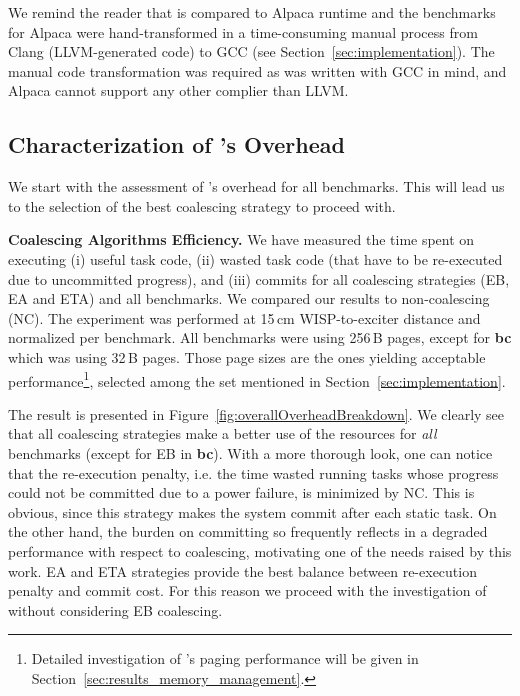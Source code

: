 We remind the reader that \sys is compared to Alpaca runtime and the benchmarks for Alpaca were hand-transformed in a time-consuming manual process from Clang (LLVM-generated code) to GCC (see Section~\ref{sec:implementation}). The manual code transformation was required as \sys was written with GCC in mind, and Alpaca cannot support any other complier than LLVM.

\subsection{Characterization of \sys's Overhead}
\label{sec:coala_overhead}

We start with the assessment of \sys's overhead for all benchmarks. This will lead us to the selection of the best coalescing strategy to proceed with.

\indent \textbf{Coalescing Algorithms Efficiency.} We have measured the time spent on executing (i) useful task code, (ii) wasted task code (that have to be re-executed due to uncommitted progress), and (iii) commits for all coalescing strategies (EB, EA and ETA) and all benchmarks. We compared our results to non-coalescing (NC). The experiment was performed at 15\,cm WISP-to-exciter distance and normalized per benchmark. All benchmarks were using 256\,B pages, except for \textbf{bc} which was using 32\,B pages. Those page sizes are the ones yielding acceptable performance\footnote{Detailed investigation of \sys's paging performance will be given in Section~\ref{sec:results_memory_management}.}, selected among the set mentioned in Section~\ref{sec:implementation}.

The result is presented in Figure~\ref{fig:overallOverheadBreakdown}. We clearly see that all coalescing strategies make a better use of the resources for \emph{all} benchmarks (except for EB in \textbf{bc}).
With a more thorough look, one can notice that the re-execution penalty, i.e. the time wasted running tasks whose progress could not be committed due to a power failure, is minimized by NC. This is obvious, since this strategy makes the system commit after each static task.
On the other hand, the burden on committing so frequently reflects in a degraded performance with respect to coalescing, motivating one of the needs raised by this work.
EA and ETA strategies provide the best balance between re-execution penalty and commit cost. For this reason we proceed with the investigation of \sys without considering EB coalescing.

